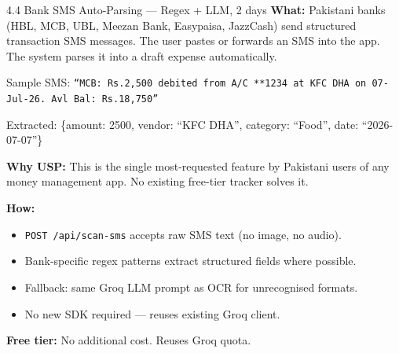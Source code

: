 \documentclass[11pt,a4paper]{article}
\begin{document}
\begin{featurebox}{4.4 \quad Bank SMS Auto-Parsing \textnormal{\small — Regex + LLM, 2 days}}
\textbf{What:} Pakistani banks (HBL, MCB, UBL, Meezan Bank, Easypaisa, JazzCash)
send structured transaction SMS messages. The user pastes or forwards an SMS
into the app. The system parses it into a draft expense automatically.

Sample SMS: \texttt{``MCB: Rs.2,500 debited from A/C **1234 at KFC DHA on
07-Jul-26. Avl Bal: Rs.18,750''}

Extracted: \{amount: 2500, vendor: ``KFC DHA'', category: ``Food'', date: ``2026-07-07''\}

\textbf{Why USP:} This is the single most-requested feature by Pakistani users
of any money management app. No existing free-tier tracker solves it.

\textbf{How:}
\begin{itemize}[leftmargin=1cm, topsep=2pt]
  \item \texttt{POST /api/scan-sms} accepts raw SMS text (no image, no audio).
  \item Bank-specific regex patterns extract structured fields where possible.
  \item Fallback: same Groq LLM prompt as OCR for unrecognised formats.
  \item No new SDK required — reuses existing Groq client.
\end{itemize}

\textbf{Free tier:} No additional cost. Reuses Groq quota.
\end{featurebox}

\vspace{6pt}
\end{document}
